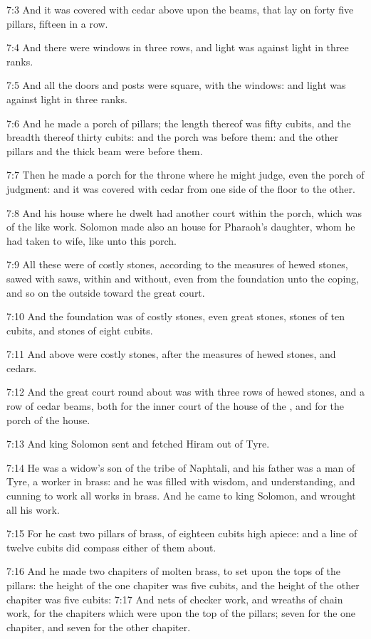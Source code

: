 7:3 And it was covered with cedar above upon the beams, that lay on forty five pillars, fifteen in a row.

7:4 And there were windows in three rows, and light was against light in three ranks.

7:5 And all the doors and posts were square, with the windows: and light was against light in three ranks.

7:6 And he made a porch of pillars; the length thereof was fifty cubits, and the breadth thereof thirty cubits: and the porch was before them: and the other pillars and the thick beam were before them.

7:7 Then he made a porch for the throne where he might judge, even the porch of judgment: and it was covered with cedar from one side of the floor to the other.

7:8 And his house where he dwelt had another court within the porch, which was of the like work. Solomon made also an house for Pharaoh's daughter, whom he had taken to wife, like unto this porch.

7:9 All these were of costly stones, according to the measures of hewed stones, sawed with saws, within and without, even from the foundation unto the coping, and so on the outside toward the great court.

7:10 And the foundation was of costly stones, even great stones, stones of ten cubits, and stones of eight cubits.

7:11 And above were costly stones, after the measures of hewed stones, and cedars.

7:12 And the great court round about was with three rows of hewed stones, and a row of cedar beams, both for the inner court of the house of the \LORD, and for the porch of the house.

7:13 And king Solomon sent and fetched Hiram out of Tyre.

7:14 He was a widow's son of the tribe of Naphtali, and his father was a man of Tyre, a worker in brass: and he was filled with wisdom, and understanding, and cunning to work all works in brass. And he came to king Solomon, and wrought all his work.

7:15 For he cast two pillars of brass, of eighteen cubits high apiece: and a line of twelve cubits did compass either of them about.

7:16 And he made two chapiters of molten brass, to set upon the tops of the pillars: the height of the one chapiter was five cubits, and the height of the other chapiter was five cubits: 7:17 And nets of checker work, and wreaths of chain work, for the chapiters which were upon the top of the pillars; seven for the one chapiter, and seven for the other chapiter.


